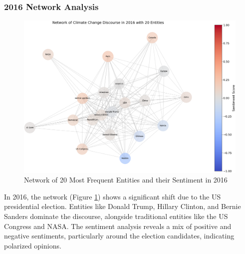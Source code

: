 \subsubsection{2016 Network Analysis}
\begin{figure}[h]
    \includegraphics[width=\textwidth]{images/topic_details/entities/network_analysis_top20_2016_spring.png}
    \caption{Network of 20 Most Frequent Entities and their Sentiment in 2016}
    \label{fig:network_2016}
\end{figure}
In 2016, the network (Figure \ref{fig:network_2016}) shows a significant shift due to the US presidential election. Entities like Donald Trump, Hillary Clinton, and Bernie Sanders dominate the discourse, alongside traditional entities like the US Congress and NASA. The sentiment analysis reveals a mix of positive and negative sentiments, particularly around the election candidates, indicating polarized opinions.

